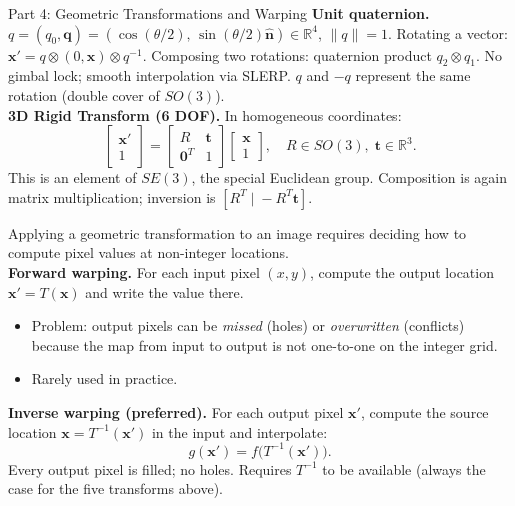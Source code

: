\documentclass[letterpaper]{article}
\begin{document}
\begin{notes}{Part 4: Geometric Transformations and Warping}
\textbf{Unit quaternion.} $q = (q_0, \mathbf{q}) = (\cos(\theta/2),\,\sin(\theta/2)\hat{\mathbf{n}}) \in \mathbb{R}^4$, $\|q\|=1$. Rotating a vector: $\mathbf{x}' = q\otimes(0,\mathbf{x})\otimes q^{-1}$. Composing two rotations: quaternion product $q_2\otimes q_1$. No gimbal lock; smooth interpolation via SLERP. $q$ and $-q$ represent the same rotation (double cover of $SO(3)$).\\

\textbf{3D Rigid Transform (6 DOF).} In homogeneous coordinates:
$$\begin{bmatrix}\mathbf{x}'\\1\end{bmatrix} = \begin{bmatrix}R & \mathbf{t}\\\mathbf{0}^T & 1\end{bmatrix}\begin{bmatrix}\mathbf{x}\\1\end{bmatrix}, \quad R\in SO(3),\;\mathbf{t}\in\mathbb{R}^3.$$
This is an element of $SE(3)$, the special Euclidean group. Composition is again matrix multiplication; inversion is $[R^T\;|\;-R^T\mathbf{t}]$.

\columnbreaknofill



Applying a geometric transformation to an image requires deciding how to compute pixel values at non-integer locations.\\

\textbf{Forward warping.} For each input pixel $(x,y)$, compute the output location $\mathbf{x}' = T(\mathbf{x})$ and write the value there.
\begin{itemize}
    \item Problem: output pixels can be \emph{missed} (holes) or \emph{overwritten} (conflicts) because the map from input to output is not one-to-one on the integer grid.
    \item Rarely used in practice.
\end{itemize}

\textbf{Inverse warping (preferred).} For each output pixel $\mathbf{x}'$, compute the source location $\mathbf{x} = T^{-1}(\mathbf{x}')$ in the input and interpolate:
$$g(\mathbf{x}') = f\bigl(T^{-1}(\mathbf{x}')\bigr).$$
Every output pixel is filled; no holes. Requires $T^{-1}$ to be available (always the case for the five transforms above).\\


\end{notes}
\end{document}
